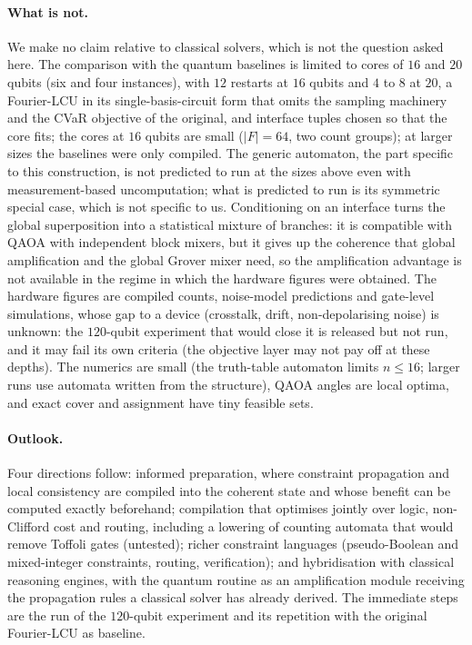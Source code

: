 \documentclass[10pt,twocolumn]{article}
\begin{document}
\paragraph{What is not.} We make no claim relative to classical solvers, which is not the question asked here. The comparison with the quantum baselines is limited to cores of $16$ and $20$ qubits (six and four instances), with $12$ restarts at $16$ qubits and $4$ to $8$ at $20$, a Fourier-LCU in its single-basis-circuit form that omits the sampling machinery and the CVaR objective of the original, and interface tuples chosen so that the core fits; the cores at $16$ qubits are small ($|F|=64$, two count groups); at larger sizes the baselines were only compiled. The generic automaton, the part specific to this construction, is not predicted to run at the sizes above even with measurement-based uncomputation; what is predicted to run is its symmetric special case, which is not specific to us. Conditioning on an interface turns the global superposition into a statistical mixture of branches: it is compatible with QAOA with independent block mixers, but it gives up the coherence that global amplification and the global Grover mixer need, so the amplification advantage is not available in the regime in which the hardware figures were obtained. The hardware figures are compiled counts, noise-model predictions and gate-level simulations, whose gap to a device (crosstalk, drift, non-depolarising noise) is unknown: the $120$-qubit experiment that would close it is released but not run, and it may fail its own criteria (the objective layer may not pay off at these depths). The numerics are small (the truth-table automaton limits $n\le16$; larger runs use automata written from the structure), QAOA angles are local optima, and exact cover and assignment have tiny feasible sets.
\paragraph{Outlook.} Four directions follow: informed preparation, where constraint propagation and local consistency are compiled into the coherent state and whose benefit can be computed exactly beforehand; compilation that optimises jointly over logic, non-Clifford cost and routing, including a lowering of counting automata that would remove Toffoli gates (untested); richer constraint languages (pseudo-Boolean and mixed-integer constraints, routing, verification); and hybridisation with classical reasoning engines, with the quantum routine as an amplification module receiving the propagation rules a classical solver has already derived. The immediate steps are the run of the $120$-qubit experiment and its repetition with the original Fourier-LCU as baseline.
\end{document}
